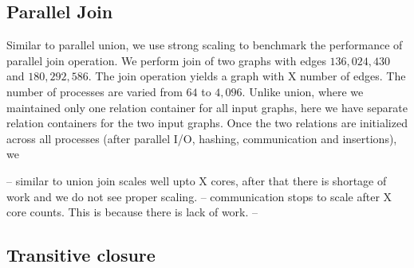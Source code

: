 


\subsection{Parallel Join}
\label{sec:join}
Similar to parallel union, we use strong scaling to benchmark the performance of parallel join operation. 
We perform join of two graphs with edges $136,024,430$ and $180,292,586$. The join operation yields a graph with X number of edges.
The number of processes are varied from $64$ to $4,096$. Unlike union, where we maintained only one relation container for all input graphs, here we have separate relation containers for the two input graphs. Once the two relations are initialized across all processes (after parallel I/O, hashing, communication and insertions), we 

-- similar to union join scales well upto X cores, after that there is shortage of work and we do not see proper scaling.
-- communication stops to scale after X core counts. This is because there is lack of work.
-- 


\subsection{Transitive closure}
\label{sec:tc}


